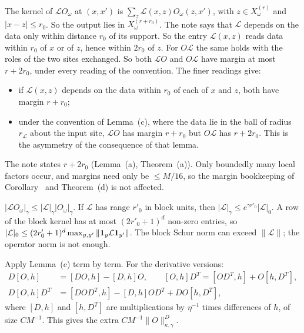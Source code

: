 \begin{detail}\label{d9:local-ops}
\begin{step}
The kernel of $\mathcal LO_\omega$ at $(x,x')$ is $\sum_z\mathcal L(x,z)O_\omega(z,x')$, with $z\in X^{(r)}_\omega$ and $|x-z|\le r_0$. So the output lies in $X^{(r+r_0)}_\omega$. The note says that $\mathcal L$ depends on the data only within distance $r_0$ of its support. So the entry $\mathcal L(x,z)$ reads data within $r_0$ of $x$ or of $z$, hence within $2r_0$ of $z$. For $O\mathcal L$ the same holds with the roles of the two sites exchanged. So both $\mathcal LO$ and $O\mathcal L$ have margin at most $r+2r_0$, under every reading of the convention. The finer readings give:
\begin{itemize}
\item if $\mathcal L(x,z)$ depends on the data within $r_0$ of each of $x$ and $z$, both have margin $r+r_0$;
\item under the convention of Lemma~(c), where the data lie in the ball of radius $r_{\mathcal L}$ about the input site, $\mathcal LO$ has margin $r+r_0$ but $O\mathcal L$ has $r+2r_0$. This is the asymmetry of the consequence of that lemma.
\end{itemize}
The note states $r+2r_0$ (Lemma~(a), Theorem~(a)). Only boundedly many local factors occur, and margins need only be $\le M/16$, so the margin bookkeeping of Corollary~ and Theorem~(d) is not affected.
\end{step}
\begin{step}
$|\mathcal LO_\omega|_\gamma\le|\mathcal L|_\gamma|O_\omega|_\gamma$. If $\mathcal L$ has range $r'_0$ in block units, then $|\mathcal L|_\gamma\le e^{\gamma r'_0}|\mathcal L|_0$. A row of the block kernel has at most $(2r'_0+1)^d$ non-zero entries, so $|\mathcal L|_0\le(2r'_0+1)^d\max_{y,y'}\|\mathbf 1_y\mathcal L\mathbf 1_{y'}\|$. The block Schur norm can exceed $\|\mathcal L\|$; the operator norm is not enough.
\end{step}
\begin{step}[(b)]
Apply Lemma~(c) term by term. For the derivative versions:
\[
\begin{aligned}
D[O,h]&=[DO,h]-[D,h]O,\qquad[O,h]D^T=[OD^T,h]+O[h,D^T],\\
D[O,h]D^T&=[DOD^T,h]-[D,h]OD^T+DO[h,D^T],
\end{aligned}
\]
where $[D,h]$ and $[h,D^T]$ are multiplications by $\eta^{-1}$ times differences of $h$, of size $CM^{-1}$. This gives the extra $CM^{-1}\|O\|^D_{\kappa,\gamma}$.
\end{step}
\end{detail}

